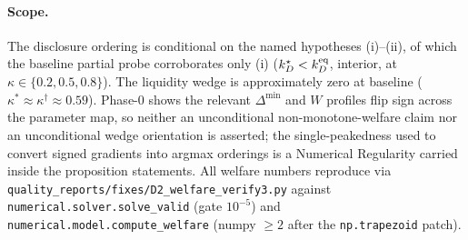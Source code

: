 \paragraph{Scope.}
The disclosure ordering is conditional on the named hypotheses (i)--(ii), of which
the baseline partial probe corroborates only (i)
($k_D^{\star}<k_D^{\textup{eq}}$, interior, at $\kappa\in\{0.2,0.5,0.8\}$). The
liquidity wedge is approximately zero at baseline
($\kappa^{\ast}\approx\kappa^{\dagger}\approx0.59$). Phase-0 shows the relevant
$\Delta^{\min}$ and $W$ profiles flip sign across the parameter map, so neither an
unconditional non-monotone-welfare claim nor an unconditional wedge orientation is
asserted; the single-peakedness used to convert signed gradients into argmax
orderings is a Numerical Regularity carried inside the proposition statements. All
welfare numbers reproduce via
\texttt{quality\_reports/fixes/D2\_welfare\_verify3.py} against
\texttt{numerical.solver.solve\_valid} (gate $10^{-5}$) and
\texttt{numerical.model.compute\_welfare} (numpy $\ge2$ after the
\texttt{np.trapezoid} patch).



%

%
